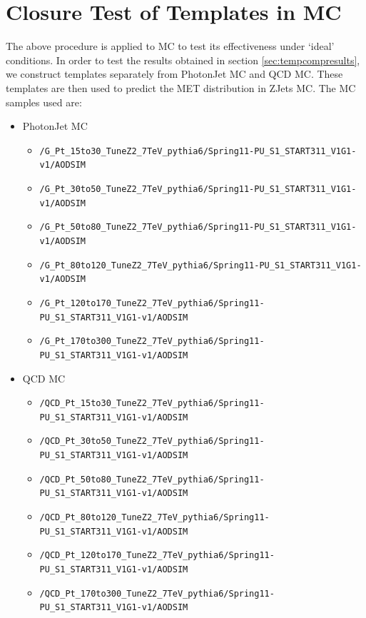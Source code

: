 
\section{Closure Test of Templates in MC}
\label{sec:mc}

The above procedure is applied to MC to test its effectiveness under `ideal' conditions. 
In order to test the 
results obtained in section \ref{sec:tempcompresults}, 
we construct templates separately from PhotonJet MC and QCD MC.
These templates are then used to predict the MET distribution in ZJets MC. The 
MC samples used are:

\begin{itemize}
\item PhotonJet MC
  \begin{itemize}
  \item \verb=/G_Pt_15to30_TuneZ2_7TeV_pythia6/Spring11-PU_S1_START311_V1G1-v1/AODSIM  =
  \item \verb=/G_Pt_30to50_TuneZ2_7TeV_pythia6/Spring11-PU_S1_START311_V1G1-v1/AODSIM  =
  \item \verb=/G_Pt_50to80_TuneZ2_7TeV_pythia6/Spring11-PU_S1_START311_V1G1-v1/AODSIM  =
  \item \verb=/G_Pt_80to120_TuneZ2_7TeV_pythia6/Spring11-PU_S1_START311_V1G1-v1/AODSIM =
  \item \verb=/G_Pt_120to170_TuneZ2_7TeV_pythia6/Spring11-PU_S1_START311_V1G1-v1/AODSIM=
  \item \verb=/G_Pt_170to300_TuneZ2_7TeV_pythia6/Spring11-PU_S1_START311_V1G1-v1/AODSIM= 	  
  \end{itemize}
\item QCD MC
  \begin{itemize}
  \item \verb=/QCD_Pt_15to30_TuneZ2_7TeV_pythia6/Spring11-PU_S1_START311_V1G1-v1/AODSIM  =
  \item \verb=/QCD_Pt_30to50_TuneZ2_7TeV_pythia6/Spring11-PU_S1_START311_V1G1-v1/AODSIM  =
  \item \verb=/QCD_Pt_50to80_TuneZ2_7TeV_pythia6/Spring11-PU_S1_START311_V1G1-v1/AODSIM  =
  \item \verb=/QCD_Pt_80to120_TuneZ2_7TeV_pythia6/Spring11-PU_S1_START311_V1G1-v1/AODSIM =
  \item \verb=/QCD_Pt_120to170_TuneZ2_7TeV_pythia6/Spring11-PU_S1_START311_V1G1-v1/AODSIM= 
  \item \verb=/QCD_Pt_170to300_TuneZ2_7TeV_pythia6/Spring11-PU_S1_START311_V1G1-v1/AODSIM= 

\end{itemize}
\end{itemize}
